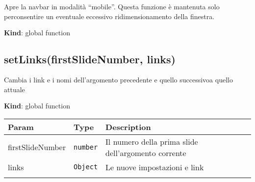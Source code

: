 Apre la navbar in modalità ``mobile''. Questa funzione è mantenuta solo
perconsentire un eventuale eccessivo ridimensionamento della finestra.

\textbf{Kind}: global function\\
\protect\hypertarget{setLinks}{}{}

\hypertarget{setlinksfirstslidenumber-links}{%
\subsection{setLinks(firstSlideNumber,
links)}\label{setlinksfirstslidenumber-links}}

Cambia i link e i nomi dell'argomento precedente e quello successivoa
quello attuale

\textbf{Kind}: global function

\begin{tabularx}{\textwidth}{XXX}
\toprule
\begin{minipage}[b]{0.30\columnwidth}\raggedright
Param\strut
\end{minipage} & \begin{minipage}[b]{0.30\columnwidth}\raggedright
Type\strut
\end{minipage} & \begin{minipage}[b]{0.30\columnwidth}\raggedright
Description\strut
\end{minipage}\tabularnewline
\midrule
\endhead
\begin{minipage}[t]{0.30\columnwidth}\raggedright
firstSlideNumber\strut
\end{minipage} & \begin{minipage}[t]{0.30\columnwidth}\raggedright
\texttt{number}\strut
\end{minipage} & \begin{minipage}[t]{0.30\columnwidth}\raggedright
Il numero della prima slide dell'argomento corrente\strut
\end{minipage}\tabularnewline
\begin{minipage}[t]{0.30\columnwidth}\raggedright
links\strut
\end{minipage} & \begin{minipage}[t]{0.30\columnwidth}\raggedright
\texttt{Object}\strut
\end{minipage} & \begin{minipage}[t]{0.30\columnwidth}\raggedright
Le nuove impostazioni e link\strut
\end{minipage}\tabularnewline
\begin{minipage}[t]{0.30\columnwidth}\raggedright

\end{minipage}
\end{tabularx}
